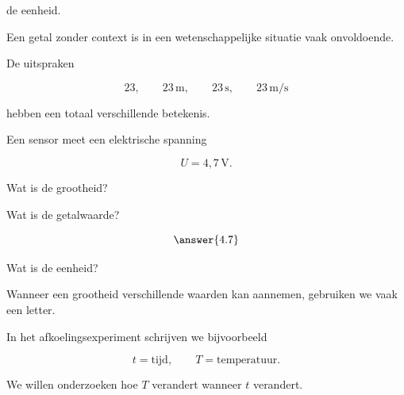 \documentclass{ximera}
\begin{document}
de eenheid.

\begin{opmerking}
Een getal zonder context is in een wetenschappelijke situatie vaak
onvoldoende.

De uitspraken

\[
23,
\qquad
23\,\mathrm{m},
\qquad
23\,\mathrm{s},
\qquad
23\,\mathrm{m/s}
\]

hebben een totaal verschillende betekenis.
\end{opmerking}


\begin{oefening}{\oefB \ESS}

Een sensor meet een elektrische spanning

\[
U=4{,}7\,\mathrm V.
\]

\begin{question}
Wat is de grootheid?

\begin{multipleChoice}
\end{multipleChoice}
\end{question}

\begin{question}
Wat is de getalwaarde?

\[
\answer{4.7}
\]
\end{question}

\begin{question}
Wat is de eenheid?

\begin{multipleChoice}
\end{multipleChoice}
\end{question}

\end{oefening}




Wanneer een grootheid verschillende waarden kan aannemen, gebruiken we
vaak een letter.

In het afkoelingsexperiment schrijven we bijvoorbeeld

\[
t=\text{tijd},
\qquad
T=\text{temperatuur}.
\]

We willen onderzoeken hoe $T$ verandert wanneer $t$ verandert.
\end{document}
